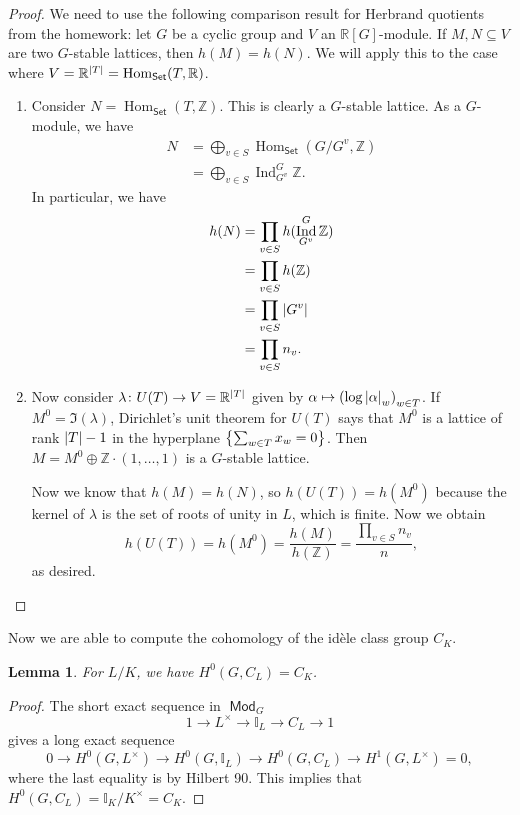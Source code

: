 \documentclass[leqno, openany]{memoir}
\newtheorem{lem}[thm]{Lemma}
\theoremstyle{definition}
\theoremstyle{remark}
\theoremstyle{plain}
\theoremstyle{definition}
\theoremstyle{remark}
\newcommand{\R}{\mathbb{R}}
\newcommand{\Z}{\mathbb{Z}}
\newcommand{\I}{\mathbb{I}}
\newcommand{\ms}[1]{\mathsf{#1}}
\DeclareMathOperator{\Hom}{Hom}
\DeclareMathOperator{\Mod}{\mathsf{Mod}}
\DeclareMathOperator{\Ind}{Ind}
\begin{document}
\begin{proof}
    We need to use the following comparison result for Herbrand quotients from the homework: let $G$ be a cyclic group and $V$ an $\R[G]$-module. If $M, N \subseteq V$ are two $G$-stable lattices, then $h(M) = h(N)$. We will apply this to the case where $V = \R^{\abs{T}} = \Hom_{\ms{Set}}(T, \R)$.
    \begin{enumerate}
        \item Consider $N = \Hom_{\ms{Set}}(T, \Z)$. This is clearly a $G$-stable lattice. As a $G$-module, we have
            \begin{align*}
                N &= \bigoplus_{v \in S} \Hom_{\ms{Set}}(G/G^v, \Z) \\
                  &= \bigoplus_{v \in S} \Ind_{G^v}^G \Z.
            \end{align*}
            In particular, we have
            \begin{align*}
                h(N) &= \prod_{v \in S} h(\Ind_{G^v}^G \Z) \\ 
                     &= \prod_{v \in S} h(\Z) \\
                     &= \prod_{v \in S} \abs{G^v} \\
                     &= \prod_{v \in S} n_v. 
            \end{align*}
        \item Now consider $\lambda \colon U(T) \to V = \R^{\abs{T}}$ given by $\alpha \mapsto {(\log \abs{\alpha}_w)}_{w \in T}$. If $M^0 = \Im(\lambda)$, Dirichlet's unit theorem for $U(T)$ says that $M^0$ is a lattice of rank $\abs{T} - 1$ in the hyperplane $\qty{\sum_{w \in T} x_w = 0}$. Then $M = M^0 \oplus \Z \cdot (1, \ldots, 1)$ is a $G$-stable lattice.

            Now we know that $h(M) = h(N)$, so $h(U(T)) = h(M^0)$ because the kernel of $\lambda$ is the set of roots of unity in $L$, which is finite. Now we obtain
            \[ h(U(T)) = h(M^0) = \frac{h(M)}{h(\Z)} = \frac{\prod_{v \in S} n_v}{n}, \]
            as desired. \qedhere
    \end{enumerate}
\end{proof}

Now we are able to compute the cohomology of the id\`ele class group $C_K$. 

\begin{lem}
    For $L/K$, we have $H^0(G, C_L) = C_K$.
\end{lem}

\begin{proof}
    The short exact sequence in $\Mod_G$
    \[ 1 \to L^{\times} \to \I_L \to C_L \to 1 \]
    gives a long exact sequence
    \[ 0 \to H^0(G, L^{\times}) \to H^0(G, \I_L) \to H^0(G, C_L) \to H^1(G, L^{\times}) = 0, \]
    where the last equality is by Hilbert 90. This implies that $H^0(G, C_L) = \I_K/K^{\times} = C_K$.
\end{proof}
\end{document}
